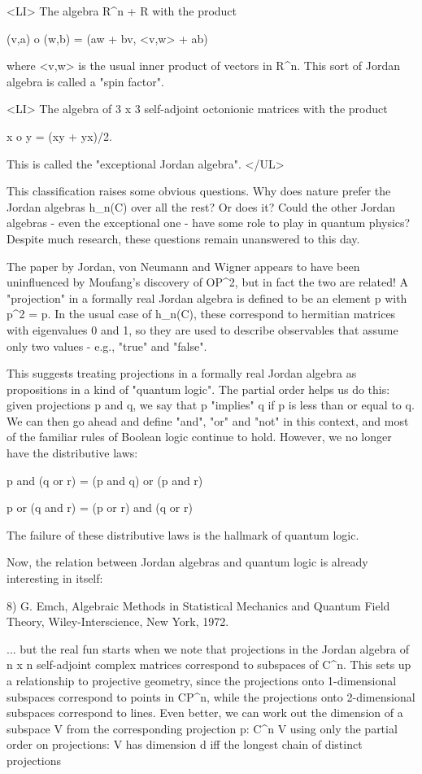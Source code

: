 <LI> The algebra R^{n} + R with the product 

(v,a) o (w,b) = (aw + bv, <v,w> + ab)

where <v,w> is the usual inner product of vectors in R^{n}.  This sort of
Jordan algebra is called a "spin factor".

<LI>
The algebra of 3 x 3 self-adjoint octonionic matrices with the product 

x o y = (xy + yx)/2.  

This is called the "exceptional Jordan algebra".
</UL>

This classification raises some obvious questions.  Why does nature
prefer the Jordan algebras h_{n}(C) over all the rest?  Or does
it?  Could the other Jordan algebras - even the exceptional one - have
some role to play in quantum physics?  Despite much research, these
questions remain unanswered to this day.

The paper by Jordan, von Neumann and Wigner appears to have been
uninfluenced by Moufang's discovery of OP^{2}, but in fact the two 
are related!  A "projection" in a formally real Jordan algebra is
defined to be an element p with p^{2} = p.  In the usual case of
h_{n}(C), these correspond to hermitian matrices with eigenvalues 
0 and 1, so they are used to describe observables that assume only 
two values - e.g., "true" and "false".  

This suggests treating projections in a formally real Jordan algebra as
propositions in a kind of "quantum logic".  The partial order helps us
do this: given projections p and q, we say that p "implies" q if p is
less than or equal to q.  We can then go ahead and define "and", "or"
and "not" in this context, and most of the familiar rules of Boolean logic 
continue to hold.  However, we no longer have the distributive laws:

p and (q or r) = (p and q) or (p and r)

p or (q and r) = (p or r) and (q or r)

The failure of these distributive laws is the hallmark of quantum logic.

Now, the relation between Jordan algebras and quantum logic is already
interesting in itself:

8) G. Emch, Algebraic Methods in Statistical Mechanics and Quantum Field
Theory, Wiley-Interscience, New York, 1972.

... but the real fun starts when we note that projections in the Jordan
algebra of n x n self-adjoint complex matrices correspond to subspaces of
C^{n}.  This sets up a relationship to projective geometry, since the
projections onto 1-dimensional subspaces correspond to points in CP^{n},
while the projections onto 2-dimensional subspaces correspond to lines.
Even better, we can work out the dimension of a subspace V from the
corresponding projection p: C^{n} \to  V using only the partial order on
projections: V has dimension d iff the longest chain of distinct
projections 

